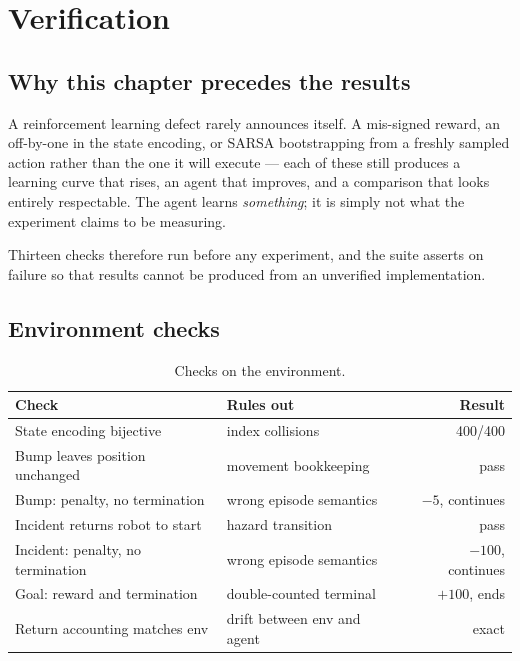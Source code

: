 \chapter{Verification}
\label{ch:verification}

\section{Why this chapter precedes the results}

A reinforcement learning defect rarely announces itself. A mis-signed reward, an off-by-one in the
state encoding, or SARSA bootstrapping from a freshly sampled action rather than the one it will
execute --- each of these still produces a learning curve that rises, an agent that improves, and a
comparison that looks entirely respectable. The agent learns \emph{something}; it is simply not
what the experiment claims to be measuring.

Thirteen checks therefore run before any experiment, and the suite asserts on failure so that
results cannot be produced from an unverified implementation.

\section{Environment checks}

\begin{table}[ht]
\centering
\caption{Checks on the environment.}
\begin{tabular}{llr}
\toprule
\textbf{Check} & \textbf{Rules out} & \textbf{Result} \\
\midrule
State encoding bijective            & index collisions          & 400/400 \\
Bump leaves position unchanged      & movement bookkeeping      & pass \\
Bump: penalty, no termination       & wrong episode semantics   & $-5$, continues \\
Incident returns robot to start     & hazard transition         & pass \\
Incident: penalty, no termination   & wrong episode semantics   & $-100$, continues \\
Goal: reward and termination        & double-counted terminal   & $+100$, ends \\
Return accounting matches env       & drift between env and agent & exact \\
\bottomrule
\end{tabular}
\end{table}

